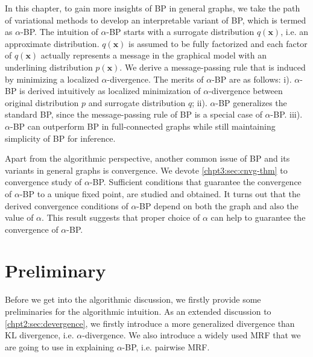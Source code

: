In this chapter, to gain more insights of BP in general graphs, we take the path of variational methods to develop an interpretable variant of BP, which is termed as $\alpha$-BP.
The intuition of $\alpha$-BP starts with a surrogate distribution $q(\bm{x})$, i.e. an approximate distribution. $q(\bm{x})$ is assumed to be fully factorized and each factor of $q(\bm{x})$ actually represents a message in the graphical model with an underlining distribution $p(\bm{x})$. We derive a message-passing rule that is induced by minimizing a localized $\alpha$-divergence. The merits of $\alpha$-BP are as follows: i). {$\alpha$-BP is derived intuitively as localized minimization of $\alpha$-divergence between original distribution $p$ and surrogate distribution $q$}; ii). {$\alpha$-BP generalizes the standard BP, since the message-passing rule of BP is a special case of $\alpha$-BP}. iii). {$\alpha$}-BP can outperform BP in full-connected graphs while still maintaining simplicity of BP for inference.

Apart from the algorithmic perspective, another common issue of BP and its variants in general graphs is convergence. We devote \autoref{chpt3:sec:cnvg-thm} to convergence study of $\alpha$-BP. Sufficient conditions that guarantee the convergence of $\alpha$-BP to a unique fixed point, are studied and obtained. It turns out that the derived convergence conditions of $\alpha$-BP depend on both the graph and also the value of $\alpha$. This result suggests that proper choice of $\alpha$ can help to guarantee the convergence of $\alpha$-BP.

\section{Preliminary}\label{chpt3:sec:preliminary}
Before we get into the algorithmic discussion, we firstly provide some preliminaries for the algorithmic intuition. As an extended discussion to \autoref{chpt2:sec:devergence}, we firstly introduce a more generalized divergence than $\mathrm{KL}$ divergence, i.e. $\alpha$-divergence. We also introduce a widely used MRF that we are going to use in explaining $\alpha$-BP, i.e. pairwise MRF.


